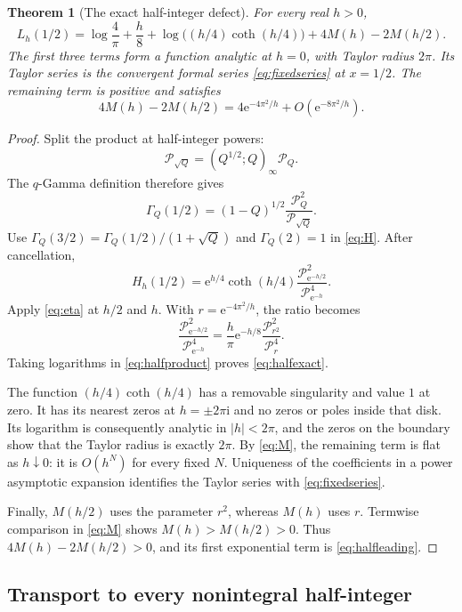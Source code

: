 \documentclass[11pt,a4paper]{article}
\numberwithin{equation}{section}
\newtheorem{theorem}{Theorem}[section]
\theoremstyle{definition}
\newcommand{\ii}{\mathrm i}
\newcommand{\ee}{\mathrm e}
\newcommand{\Pq}{\mathcal P}
\begin{document}
\begin{theorem}[The exact half-integer defect]
\label{thm:half}
For every real $h>0$,
\begin{equation}
\boxed{\displaystyle
L_h(1/2)=\log\frac4\pi+\frac h8
 +\log\bigl((h/4)\coth(h/4)\bigr)+4M(h)-2M(h/2).}
\label{eq:halfexact}
\end{equation}
The first three terms form a function analytic at $h=0$, with Taylor radius $2\pi$. Its Taylor series is the convergent formal series \eqref{eq:fixedseries} at $x=1/2$. The remaining term is positive and satisfies
\begin{equation}
4M(h)-2M(h/2)=4\ee^{-4\pi^2/h}+O(\ee^{-8\pi^2/h}).
\label{eq:halfleading}
\end{equation}
\end{theorem}
\begin{proof}
Split the product at half-integer powers:
\[
\Pq_{\sqrt Q}=(Q^{1/2};Q)_\infty\Pq_Q.
\]
The $q$-Gamma definition therefore gives
\[
\Gamma_Q(1/2)=(1-Q)^{1/2}\frac{\Pq_Q^2}{\Pq_{\sqrt Q}}.
\]
Use $\Gamma_Q(3/2)=\Gamma_Q(1/2)/(1+\sqrt Q)$ and $\Gamma_Q(2)=1$ in \eqref{eq:H}. After cancellation,
\begin{equation}
H_h(1/2)=\ee^{h/4}\coth(h/4)
                      \frac{\Pq_{\ee^{-h/2}}^2}{\Pq_{\ee^{-h}}^4}.
\label{eq:halfproduct}
\end{equation}
Apply \eqref{eq:eta} at $h/2$ and $h$. With $r=\ee^{-4\pi^2/h}$, the ratio becomes
\[
\frac{\Pq_{\ee^{-h/2}}^2}{\Pq_{\ee^{-h}}^4}
 =\frac h\pi\ee^{-h/8}\frac{\Pq_{r^2}^2}{\Pq_r^4}.
\]
Taking logarithms in \eqref{eq:halfproduct} proves \eqref{eq:halfexact}.

The function $(h/4)\coth(h/4)$ has a removable singularity and value $1$ at zero. It has its nearest zeros at $h=\pm2\pi\ii$ and no zeros or poles inside that disk. Its logarithm is consequently analytic in $|h|<2\pi$, and the zeros on the boundary show that the Taylor radius is exactly $2\pi$. By \eqref{eq:M}, the remaining term is flat as $h\downarrow0$: it is $O(h^N)$ for every fixed $N$. Uniqueness of the coefficients in a power asymptotic expansion identifies the Taylor series with \eqref{eq:fixedseries}.

Finally, $M(h/2)$ uses the parameter $r^2$, whereas $M(h)$ uses $r$. Termwise comparison in \eqref{eq:M} shows $M(h)>M(h/2)>0$. Thus $4M(h)-2M(h/2)>0$, and its first exponential term is \eqref{eq:halfleading}.
\end{proof}

\subsection{Transport to every nonintegral half-integer}
\end{document}

